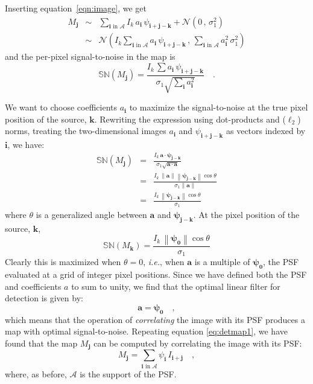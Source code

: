 \documentclass[11pt,letterpaper,linenumbers]{aastex63}
\newcommand{\equationname}{equation}
\newcommand{\eqnref}[1]{\mbox{\equationname~\ref{#1}}}
\newcommand{\latin}[1]{\emph{#1}}
\newcommand{\ie}{\latin{i.e.}}
\newcommand{\drawnfrom}{\sim}
\newcommand{\gaussianN}{\mathcal{N}}
\newcommand{\gaussx}[2]{\gaussianN\!\left(#1 \, , \, #2\right)}
\newcommand{\psf}{\psi}
\newcommand{\psfat}[1]{\psf_{#1}}
\newcommand{\signoise}{[S/N]}
\newcommand{\snr}[1]{\mathbb{SN}(#1)}
\newcommand{\norm}[1]{\left\lVert #1 \right\rVert}
\renewcommand{\vec}[1]{\boldsymbol{#1}}
\newcommand{\avec}{\vec{a}}
\newcommand{\ivec}{\vec{i}}
\newcommand{\jvec}{\vec{j}}
\newcommand{\kvec}{\vec{k}}
\newcommand{\iina}{\ivec \,\, \mathrm{in} \,\, \mathcal{A}}
\begin{document}
Inserting \eqnref{eqn:image}, we get
\begin{eqnarray}
M_{\jvec} &\drawnfrom& \sum_{\iina}
  I_k \, a_{\ivec} \, \psfat{\ivec + \jvec - \kvec} + \gaussx{0}{\sigma_1^2}
  \\
&\drawnfrom& \gaussx{ I_k \sum_{\iina} a_{\ivec} \, \psfat{\ivec + \jvec - \kvec}}%
    {\sum_{\iina} a_{\ivec}^2 \, \sigma_1^2}
\end{eqnarray}
and the per-pixel signal-to-noise in the map is
\begin{equation}
  \snr{M_{\jvec}} = \frac{I_k \, \sum a_{\ivec} \, \psfat{\ivec + \jvec - \kvec}}{\sigma_1 \sqrt{\sum_{\ivec} a_{\ivec}^2}} \quad .
  \label{eq:detmapsn1}
\end{equation}

We want to choose coefficients $a_{\ivec}$ to maximize the 
signal-to-noise at the true pixel position of the source,
$\kvec$.  Rewriting the expression using dot-products and
($\ell_2$) norms, treating the two-dimensional images
$a_{\ivec}$ and $\psfat{\ivec + \jvec - \kvec}$ as vectors indexed by
$\ivec$, we have:
\begin{eqnarray}
  \snr{M_{\jvec}} &=& \frac{I_k \, \avec \cdot \bm{\psfat{j-k}}}{\sigma_1 \sqrt{\avec \cdot \avec}} \label{eqn:psfdotprod} \\
 &=& \frac{I_k \, \norm{\avec} \norm{\bm{\psfat{j-k}}} \cos \theta}{\sigma_1 \norm{\avec}} \\
 &=& \frac{I_k \, \norm{\bm{\psfat{j-k}}} \cos \theta}{\sigma_1}
\end{eqnarray}
where $\theta$ is a generalized angle between $\avec$ and $\bm{\psfat{j-k}}$.
At the pixel position of the source, $\kvec$,
\begin{equation}
\snr{M_{\kvec}} = \frac{I_k \, \norm{\bm{\psfat{0}}} \cos \theta}{\sigma_1}
\label{eqn:sndsingle}
\end{equation}
Clearly this is maximized when $\theta = 0$, \ie, when $\avec$ is a
multiple of $\bm{\psfat{0}}$, the PSF evaluated at a grid of integer
pixel positions.  Since we have defined both the PSF and coefficients
$a$ to sum to unity, we find that the optimal linear filter for
detection is given by:
\begin{equation}
\avec = \bm{\psfat{0}} \quad ,
\end{equation}
which means that the operation of \emph{correlating} the image with
its PSF produces a map with optimal signal-to-noise.  Repeating
equation \ref{eq:detmap1}, we have found that the map $M_{\jvec}$ can
be computed by correlating the image with its PSF:
\begin{equation}
M_{\jvec} = \sum_{\iina} \psfat{\ivec} \, I_{\ivec + \jvec} \quad ,
\end{equation}
where, as before, $\mathcal{A}$ is the support of the PSF.
\end{document}
